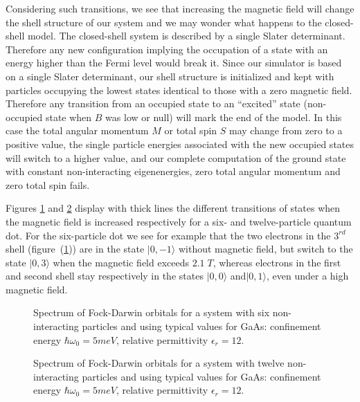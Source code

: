Considering such transitions, we see that increasing the magnetic field will change the shell structure of our system and we may wonder what happens to the closed-shell model.
The closed-shell system is described by a single Slater determinant. Therefore any new configuration implying the occupation of a state with an energy higher than the Fermi level would break it.
Since our simulator is based on a single Slater determinant, our shell structure is initialized and kept with particles occupying the lowest states identical to those with a zero magnetic field.
Therefore any transition from an occupied state to an ``excited'' state (non-occupied state when $B$ was low or null) will mark the end of the model. In this case the total angular momentum $M$ or total spin $S$ may change from zero to a positive value, the single particle energies associated with the new occupied states will switch to a higher value, and our complete computation of the ground state with constant non-interacting eigenenergies, zero total angular momentum and zero total spin fails.

Figures \ref{fig:fockDarwin06} and \ref{fig:fockDarwin12} display with thick lines the different transitions of states when the magnetic field is increased respectively for a six- and twelve-particle quantum dot. For the six-particle dot we see for example that the two electrons in the $3^{rd}$ shell (figure~(\ref{fig:fockDarwin06})) are in the state $| 0,-1\rangle$ without magnetic field, but switch to the state $| 0,3\rangle$ when the magnetic field exceeds $2.1 \;T$, whereas electrons in the first and second shell stay respectively in the states $| 0,0\rangle$ and$| 0,1\rangle$, even under a high magnetic field.
\begin{figure}
\centering
\scalebox{0.8}{}
\caption{\label{fig:fockDarwin06} Spectrum of Fock-Darwin orbitals for a system with six non-interacting particles and using typical values for GaAs: confinement energy $\hbar \omega_0=5meV$, relative permittivity $\epsilon_r=12$.}
\end{figure}

\begin{figure} %
\centering
\scalebox{0.8}{}
\caption{\label{fig:fockDarwin12} Spectrum of Fock-Darwin orbitals for a system with twelve non-interacting particles and using typical values for GaAs: confinement energy $\hbar \omega_0=5meV$, relative permittivity $\epsilon_r=12$.}
\end{figure}

